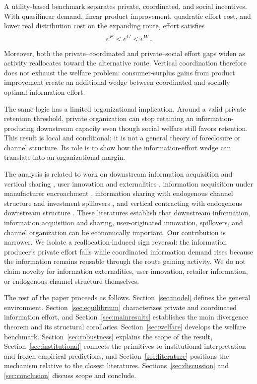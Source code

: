 A utility-based benchmark separates private, coordinated, and social incentives. With quasilinear demand, linear product improvement, quadratic effort cost, and lower real distribution cost on the expanding route, effort satisfies
\[
e^{P}<e^{C}<e^{W}.
\]
Moreover, both the private--coordinated and private--social effort gaps widen as activity reallocates toward the alternative route. Vertical coordination therefore does not exhaust the welfare problem: consumer-surplus gains from product improvement create an additional wedge between coordinated and socially optimal information effort.

The same logic has a limited organizational implication. Around a valid private retention threshold, private organization can stop retaining an information-producing downstream capacity even though social welfare still favors retention. This result is local and conditional; it is not a general theory of foreclosure or channel structure. Its role is to show how the information-effort wedge can translate into an organizational margin.

The analysis is related to work on downstream information acquisition and vertical sharing \citep{Guo2009,GuoIyer2010}, user innovation and externalities \citep{GambardellaRaaschVonHippel2017}, information acquisition under manufacturer encroachment \citep{HuEtAl2021}, information sharing with endogenous channel structure and investment spillovers \citep{HuangChenGuan2020}, and vertical contracting with endogenous downstream structure \citep{PagnozziPiccoloReisinger2021}. These literatures establish that downstream information, information acquisition and sharing, user-originated innovation, spillovers, and channel organization can be economically important. Our contribution is narrower. We isolate a reallocation-induced sign reversal: the information producer's private effort falls while coordinated information demand rises because the information remains reusable through the route gaining activity. We do not claim novelty for information externalities, user innovation, retailer information, or endogenous channel structure themselves.

The rest of the paper proceeds as follows. Section~\ref{sec:model} defines the general environment. Section~\ref{sec:equilibrium} characterizes private and coordinated information effort, and Section~\ref{sec:mainresults} establishes the main divergence theorem and its structural corollaries. Section~\ref{sec:welfare} develops the welfare benchmark. Section~\ref{sec:robustness} explains the scope of the result, Section~\ref{sec:institutional} connects the primitives to institutional interpretation and frozen empirical predictions, and Section~\ref{sec:literature} positions the mechanism relative to the closest literatures. Sections~\ref{sec:discussion} and \ref{sec:conclusion} discuss scope and conclude.
